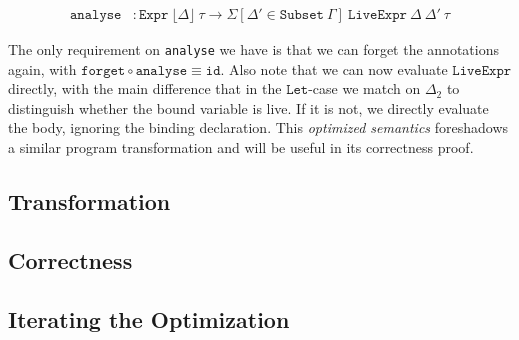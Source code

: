 \documentclass[sigplan,nonacm,screen,review,timestamp]{acmart}
\newcommand{\I}[1]{\texttt{#1}\xspace}
\newcommand{\Floor}[1]{\lfloor #1 \rfloor\xspace}
\newcommand{\Existential}[2]{\Sigma[ #1 \in #2 ]\xspace}
\begin{document}
\begin{align*}
  \I{analyse}
    &:  \I{Expr}\ \Floor{\Delta}\ \tau
    \to \Existential{\Delta'}{\I{Subset}\ \Gamma}\ \I{LiveExpr}\ \Delta\ \Delta'\ \tau
\end{align*}

The only requirement on \I{analyse} we have is that we can forget the annotations again,
with $\I{forget} \circ \I{analyse} \equiv \I{id}$.
Also note that we can now evaluate $\I{LiveExpr}$ directly, with the main difference
that in the $\I{Let}$-case we match on $\Delta_2$ to distinguish whether the bound variable is live.
If it is not, we directly evaluate the body, ignoring the binding declaration.
This \emph{optimized semantics} foreshadows a similar program transformation
and will be useful in its correctness proof.

\subsection{Transformation}

\subsection{Correctness}

\subsection{Iterating the Optimization}
\cite{bove2016recursion}



{}
\end{document}
